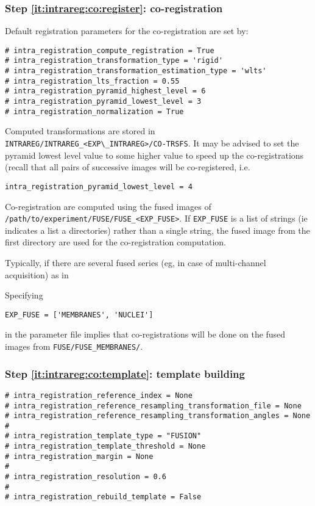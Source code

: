 \subsubsection{Step \ref{it:intrareg:co:register}: co-registration}
\label{sec:cli:intraregistration:coregistration}
Default registration parameters for the co-registration are set by:
\begin{verbatim}
# intra_registration_compute_registration = True
# intra_registration_transformation_type = 'rigid'
# intra_registration_transformation_estimation_type = 'wlts'
# intra_registration_lts_fraction = 0.55
# intra_registration_pyramid_highest_level = 6
# intra_registration_pyramid_lowest_level = 3
# intra_registration_normalization = True
\end{verbatim}
Computed transformations are stored in \verb|INTRAREG/INTRAREG_<EXP\_INTRAREG>/CO-TRSFS|.
It may be advised to set the pyramid lowest level value to some higher value to speed up the co-registrations (recall that all pairs of successive images will be co-registered, i.e.
\begin{verbatim}
intra_registration_pyramid_lowest_level = 4
\end{verbatim}

Co-registration are computed using the fused images of
\texttt{/path/to/experiment/FUSE/FUSE\_<EXP\_FUSE>}. If
\texttt{EXP\_FUSE} is a list of strings (ie indicates a list a
directories) rather than a single string, the fused image from the
first directory are used for the co-registration computation.

Typically, if there are several fused series (eg, in case of multi-channel
acquisition) as in

\mbox{}
\mbox{}

Specifying
\begin{verbatim}
EXP_FUSE = ['MEMBRANES', 'NUCLEI']
\end{verbatim}
in the parameter file implies that co-registrations will be done on
the fused images from \texttt{FUSE/FUSE\_MEMBRANES/}.



\subsubsection{Step \ref{it:intrareg:co:template}: template building}
\label{sec:cli:intraregistration:template}

\begin{verbatim}
# intra_registration_reference_index = None
# intra_registration_reference_resampling_transformation_file = None
# intra_registration_reference_resampling_transformation_angles = None
#
# intra_registration_template_type = "FUSION"
# intra_registration_template_threshold = None
# intra_registration_margin = None
#
# intra_registration_resolution = 0.6
#
# intra_registration_rebuild_template = False
\end{verbatim}

